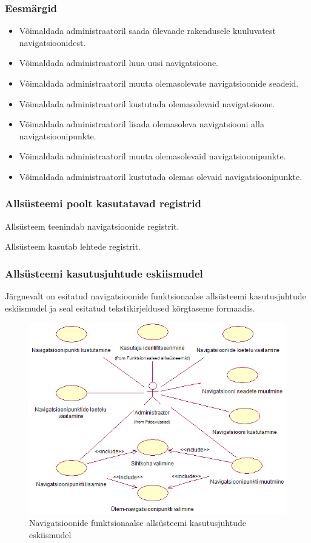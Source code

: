 \documentclass[a4paper,12pt]{article} %
\begin{document}
\subsubsection{Eesmärgid}
\begin{itemize}
\item Võimaldada administraatoril saada ülevaade rakendusele kuuluvatest navigatsioonidest.
\item Võimaldada administraatoril luua uusi navigatsioone.
\item Võimaldada administraatoril muuta olemasolevate navigatsioonide seadeid.
\item Võimaldada administraatoril kustutada olemasolevaid navigatsioone.
\item Võimaldada administraatoril lisada olemasoleva navigatsiooni alla navigatsioonipunkte.
\item Võimaldada administraatoril muuta olemasolevaid navigatsioonipunkte.
\item Võimaldada administraatoril kustutada olemas olevaid navigatsioonipunkte.
\end{itemize}
\subsubsection{Allsüsteemi poolt kasutatavad registrid}
Allsüsteem teenindab navigatsioonide registrit.\par
Allsüsteem kasutab lehtede registrit.
\subsubsection{Allsüsteemi kasutusjuhtude eskiismudel}
Järgnevalt on esitatud navigatsioonide funktsionaalse allsüsteemi kasutusjuhtude eskiismudel ja seal esitatud tekstikirjeldused kõrgtaseme formaadis.
\begin{figure}[H]
\begin{center}
\includegraphics[bb=0 0 582 434,scale=1]{./diagrams/navigations-subsystem-use-case-digram.png}
\caption{Navigatsioonide funktsionaalse allsüsteemi kasutusjuhtude eskiismudel}
\end{center}
\end{figure}
\end{document}
